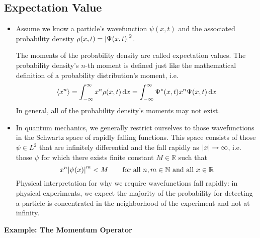 \documentclass[11pt, a4paper]{article}
\newcommand{\diff}{\mathop{}\!\mathrm{d}} %
\renewcommand{\P}{\Psi}  %
\begin{document}
\subsection{Expectation Value}
\begin{itemize}
	\item Assume we know a particle's wavefunction $ \psi(x, t) $ and the associated probability density $ \rho(x, t) = \abs{\P(x, t)}^{2} $. 
	
	The moments of the probability density are called expectation values. The probability density's $ n $-th moment is defined just like the mathematical definition of a probability distribution's moment, i.e.
	\begin{equation*}
		\ev{x^{n}} = \int_{-\infty}^{\infty} x^{n}\rho(x, t) \diff x = \int_{-\infty}^{\infty} \Psi^{*}(x, t)x^{n}\Psi(x,t)\diff x
	\end{equation*}
	In general, all of the probability density's moments may not exist. 
	
	\item In quantum mechanics, we generally restrict ourselves to those wavefunctions in the Schwartz space of rapidly falling functions. This space consists of those $ \psi \in L^{2} $ that are infinitely differential and the fall rapidly as $ \abs{x} \to \infty $, i.e. those $ \psi $ for which there exists finite constant $ M \in \mathbb{R} $ such that
	\begin{equation*}
		x^{n} \abs{\psi(x)}^{m} < M \qquad \text{for all } n, m \in \mathbb{N} \text{ and all } x \in \mathbb{R}
	\end{equation*}
	Physical interpretation for why we require wavefunctions fall rapidly: in physical experiments, we expect the majority of the probability for detecting a particle is concentrated in the neighborhood of the experiment and not at infinity. 
\end{itemize}
\textbf{Example: The Momentum Operator}
\end{document}
